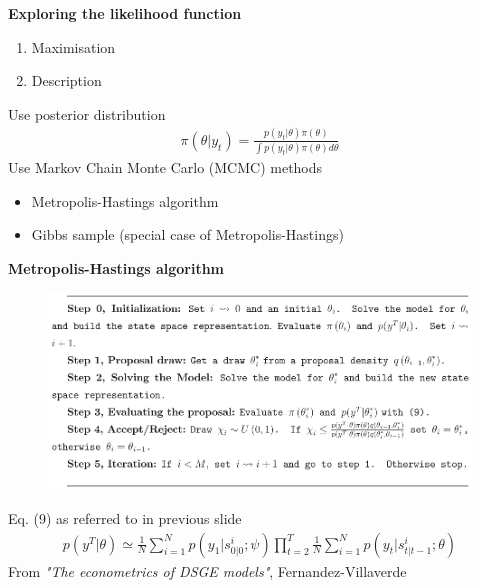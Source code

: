 \documentclass{beamer}
\begin{document}
\begin{frame}
  \textbf{Exploring the likelihood function}
  \begin{enumerate}
    \item Maximisation
    \item Description
  \end{enumerate}
  \medskip
  Use posterior distribution
  \begin{align}
    \pi(\theta|y_t) = \frac{p(y_t|\theta)\pi(\theta)}{\int p(y_t|\theta)\pi(\theta)d\theta}
  \end{align}
  \medskip
  Use Markov Chain Monte Carlo (MCMC) methods
  \begin{itemize}
    \item Metropolis-Hastings algorithm
    \item Gibbs sample (special case of Metropolis-Hastings)
  \end{itemize}
\end{frame}

\begin{frame}
  \textbf{Metropolis-Hastings algorithm}
  \begin{figure}
    \includegraphics[scale=.8]{metropolis.eps}
  \end{figure}
\end{frame}

\begin{frame}
  Eq. (9) as referred to in previous slide
  \begin{align*}
   p(y^T|\theta) \simeq \frac{1}{N} \sum^N_{i=1}p(y_1|s^i_{0|0}; \psi) \prod^T_{t=2}\frac{1}{N}\sum^N_{i=1}p(y_t|s^i_{t|t-1};\theta)
  \end{align*}
  \medskip
  From \textit{"The econometrics of DSGE models"}, Fernandez-Villaverde
\end{frame}
\end{document}
